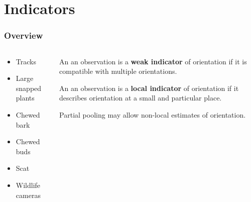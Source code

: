 \documentclass[compress, aspectratio=169]{beamer}
\begin{document}
\section{Indicators}

\begin{frame}
	\frametitle{Overview}
	\begin{columns}
	\begin{column}{0.5\textwidth}
	\begin{itemize}
		\item Tracks
		\item Large snapped plants
		\item Chewed bark
		\item Chewed buds
		\item Scat
		\item Wildlife cameras
	\end{itemize}
	\end{column}
	\begin{column}{0.5\textwidth}
	\begin{tcolorbox}[title=Definition, colframe=UNBCGreen]
	An an observation is a \textbf{weak indicator} of orientation if it is compatible with multiple orientations.
	\end{tcolorbox}
	\begin{tcolorbox}[title=Definition, colframe=UNBCGreen]
	An an observation is a \textbf{local indicator} of orientation if it describes orientation at a small and particular place.
	\end{tcolorbox}
	\begin{cmarker}
	Partial pooling may allow non-local estimates of orientation.
	\end{cmarker}
	\end{column}
	\end{columns}
\end{frame}
\end{document}
